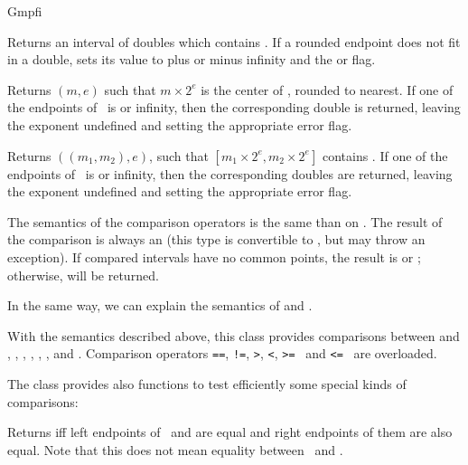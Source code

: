 \begin{ccRefClass} {Gmpfi}

        {Returns an interval of doubles which contains \ccVar. If a
        rounded endpoint does not fit in a double, sets its value to plus
        or minus infinity and the  or  flag.}

        {Returns \((m,e)\) such that \(m \times 2^e\) is the center of
        \ccVar, rounded to nearest. If one of the endpoints of \ccVar~is
         or infinity, then the corresponding double is returned,
        leaving the exponent undefined and setting the appropriate
        error flag.}

        {Returns \(((m_1,m_2),e)\), such that \([m_1 \times 2^e,m_2
        \times 2^e]\) contains \ccVar . If one of the endpoints of
        \ccVar~is  or infinity, then the corresponding doubles
        are returned, leaving the exponent undefined and setting the
        appropriate error flag.}



The semantics of the comparison operators is the same than on
. The result of the comparison is always an
 (this type is convertible to , but may
throw an exception). If compared intervals have no common points, the
result is  or ; otherwise,
 will be returned.

In the same way, we can explain the semantics of
 and .

With the semantics described above, this class provides comparisons between
 and , , , ,
, ,  and . Comparison operators
\verb-==-, \verb-!=-, \verb->-, \verb-<-, \verb->=- \ and \verb-<=- \ are
overloaded.

The class provides also functions to test efficiently some special kinds
of comparisons:

        {Returns  iff left endpoints of \ccVar~and
         are equal and right endpoints of them are also equal. Note
        that this does not mean equality between \ccVar~and .}


\end{ccRefClass}
